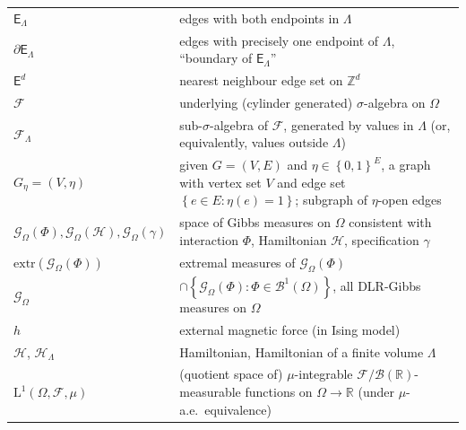 \documentclass[12pt]{article}
\newcommand{\B}{\mathcal{B}}
\newcommand{\BB}{\mathscr{B}}
\newcommand{\E}{\mathsf{E}}
\newcommand{\F}{\mathcal{F}}
\newcommand{\G}{\mathcal{G}}
\renewcommand{\H}{\mathcal{H}}
\newcommand{\R}{\mathbb{R}}
\newcommand{\Z}{\mathbb{Z}}
\newcommand{\extr}{\mathrm{extr}}
\newcommand{\set}[1]{\left\{#1\right\}}
\newcommand{\ra}{\rightarrow}
\newcommand{\1}{\mathbbm{1}}
\newcommand{\5}{\vspace{0.5cm}}
\theoremstyle{definition}
\begin{document}
\begin{tabular}{p{4cm}p{10cm}}
$\E_\Lambda$ & edges with both endpoints in $\Lambda$ \\
$\partial\E_\Lambda$ & edges with precisely one endpoint of $\Lambda$, ``boundary of $\E_\Lambda$'' \\
$\E^d$ & nearest neighbour edge set on $\Z^d$ \\
$\F$ & underlying (cylinder generated) $\sigma$-algebra on $\Omega$ \\
$\F_\Lambda$ & sub-$\sigma$-algebra of $\F$, generated by values in $\Lambda$ (or, equivalently, values outside $\Lambda$)  \\
$G_\eta=(V,\eta)$ & given $G=(V,E)$ and $\eta\in\set{0,1}^E$, a graph with vertex set $V$ and edge set $\set{e\in E:\eta(e)=1}$; subgraph of $\eta$-open edges \\
$\G_\Omega(\Phi),\G_\Omega(\H),\G_\Omega(\gamma)$ & space of Gibbs measures on $\Omega$ consistent with interaction $\Phi$, Hamiltonian $\H$, specification $\gamma$\\
$\extr(\G_\Omega(\Phi))$ & extremal measures of $\G_\Omega(\Phi)$ \\
$\G_\Omega$ & $\cap\set{\G_\Omega(\Phi):\Phi\in\BB^1(\Omega)}$, all DLR-Gibbs measures on $\Omega$ \\
$h$ & external magnetic force (in Ising model) \\
$\H$, $\H_\Lambda$ & Hamiltonian, Hamiltonian of a finite volume $\Lambda$ \\
$\mathrm{L}^1(\Omega,\F,\mu)$ & (quotient space of) $\mu$-integrable $\F/\B(\R)$-measurable functions on $\Omega\ra\R$ (under $\mu$-a.e.~equivalence) 
\end{tabular} 

\pagebreak
\end{document}
